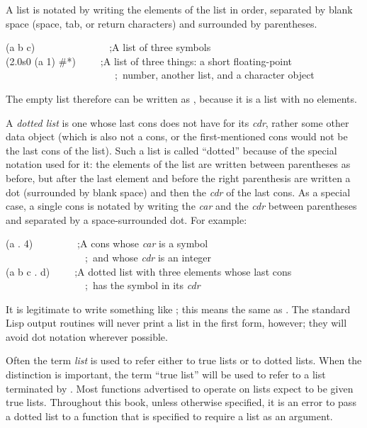 A list is notated by writing the elements of the list in order,
separated by blank space (space, tab, or return characters)
and surrounded by parentheses.
\begin{lisp}
(a b c)~~~~~~~~~~~~~~~;\textrm{A list of three symbols} \\
(2.0s0 (a 1) \#{\Xbackslash}*)~~~~~;\textrm{A list of three things: a short floating-point} \\
~~~~~~~~~~~~~~~~~~~~~~;~\textrm{number, another list, and a character object}
\end{lisp}
The empty list {\nil} therefore can be written as {\emptylist}, because it is a list
with no elements.

A \emph{dotted list} is one whose last cons does not have {\nil} for
its \emph{cdr}, rather some other data object (which is also not a cons,
or the first-mentioned cons would not be the last cons of the list).
Such a list is called ``dotted'' because of the special notation
used for it: the elements of the list are written between
parentheses as before, but after the last element and before
the right parenthesis are written a dot (surrounded by blank space)
and then the \emph{cdr} of the last cons.  As a special case,
a single cons is notated by writing the \emph{car} and the \emph{cdr} between
parentheses and separated by a space-surrounded dot.
For example:
\begin{lisp}
(a . 4)~~~~~~~~~;\textrm{A cons whose \emph{car} is a symbol} \\
~~~~~~~~~~~~~~~~;~\textrm{and whose \emph{cdr} is an integer} \\
(a b c . d)~~~~~;\textrm{A dotted list with three elements whose last cons} \\
~~~~~~~~~~~~~~~~;~\textrm{has the symbol  in its \emph{cdr}}
\end{lisp}

It is legitimate to write something like ;
this means the same as .  The standard Lisp
output routines will never print a list in the first form, however;
they will avoid dot notation wherever possible.

Often the term \emph{list} is used to refer either to true lists or to
dotted lists.  When the distinction is important,
the term ``true list'' will be used to refer to a list
terminated by {\nil}.  Most functions
advertised to operate on lists expect to be given true lists. Throughout
this book, unless otherwise specified, it is an error to pass a dotted
list to a function that is specified to require a list as an argument.

